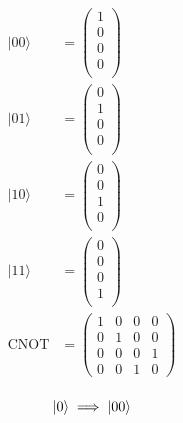 \documentclass{article}%
\begin{document}
\begin{align*}
    |00\rangle &= \begin{pmatrix}
                     1 \\
                     0 \\
                     0 \\
                     0 \\
                 \end{pmatrix} \\
    |01\rangle &= \begin{pmatrix}
                     0 \\
                     1 \\
                     0 \\
                     0 \\
                 \end{pmatrix} \\
    |10\rangle &= \begin{pmatrix}
                     0 \\
                     0 \\
                     1 \\
                     0 \\
                 \end{pmatrix} \\
    |11\rangle &= \begin{pmatrix}
                     0 \\
                     0 \\
                     0 \\
                     1\\
                 \end{pmatrix}\\
    \text{CNOT} &= \begin{pmatrix}
                1 & 0 & 0 & 0 \\
                0 & 1 & 0 & 0 \\
                0 & 0 & 0 & 1 \\
                0 & 0 & 1 & 0
            \end{pmatrix}\\
\end{align*}


\begin{equation*}
    |0\rangle \implies |00\rangle
\end{equation*}
\end{document}

